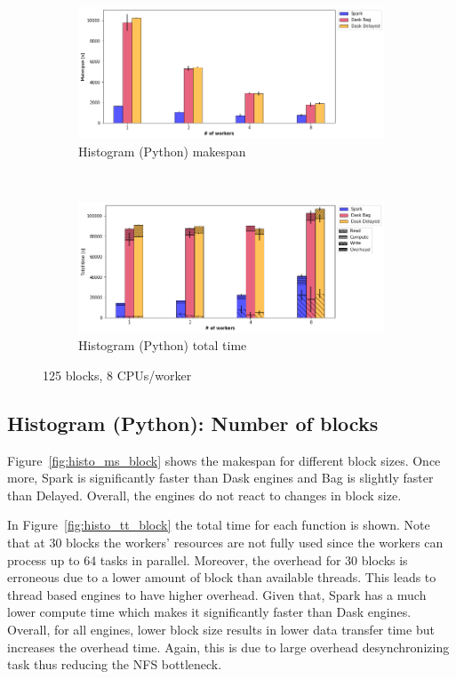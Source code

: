 \documentclass[conference]{IEEEtran}
\begin{document}
\begin{figure}[!b]
    \centering
    \begin{subfigure}[b]{\columnwidth}
        \includegraphics[clip,width=\columnwidth]{images/histo_worker.png}%
        \caption{Histogram (Python) makespan}\label{fig:histo_ms_worker}
    \end{subfigure}
    \\
    \begin{subfigure}[b]{\columnwidth}
        \includegraphics[clip,width=\columnwidth]{images/histo_idle_worker.png}%
        \caption{Histogram (Python) total time}\label{fig:histo_tt_worker}
    \end{subfigure}
    \caption{125 blocks, 8 CPUs/worker}\label{fig:histo_worker}
\end{figure}

\subsection{Histogram (Python): Number of blocks}
Figure~\ref{fig:histo_ms_block} shows the makespan for different block sizes. 
Once more, Spark is significantly faster than Dask engines and Bag is slightly
faster than Delayed. Overall, the engines do not react to changes in block size.

In Figure~\ref{fig:histo_tt_block} the total time for each function is shown.
Note that at 30 blocks the workers' resources are not fully used since the
workers can process up to 64 tasks in parallel. Moreover, the overhead for
30 blocks is erroneous due to a lower amount of block than available threads.
This leads to thread based engines to have higher overhead. Given that, 
Spark has a much lower compute time which makes it significantly faster
than Dask engines. Overall, for all engines, lower block size results in lower
data transfer time but increases the overhead time. Again, this is due to large overhead
desynchronizing task thus reducing the NFS bottleneck.
\end{document}
